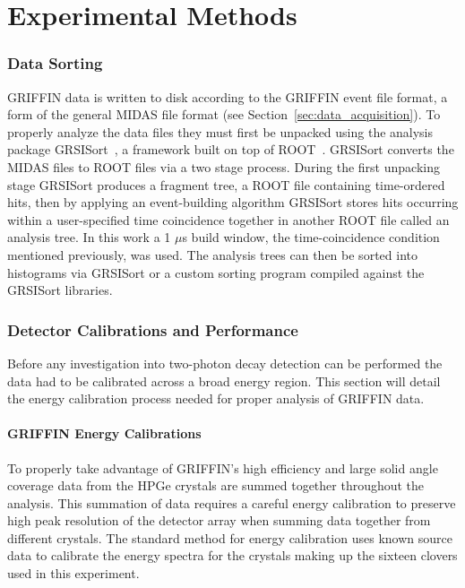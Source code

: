 \documentclass[cnatzke_thesis_proposal.tex]{subfiles}
\begin{document}
\chapter{Experimental Methods}

\subsection{Data Sorting}
GRIFFIN data is written to disk according to the GRIFFIN event file format, a form of the general MIDAS file format (see Section~\ref{sec:data_acquisition}).
To properly analyze the data files they must first be unpacked using the analysis package GRSISort~\cite{bildstein_griffincollaborationgrsisort_2019}, a framework built on top of ROOT~\cite{brun_root-projectroot_2019}.
GRSISort converts the MIDAS files to ROOT files via a two stage process.
During the first unpacking stage GRSISort produces a fragment tree, a ROOT file containing time-ordered hits, then by applying an event-building algorithm GRSISort stores hits occurring within a user-specified time coincidence together in another ROOT file called an analysis tree.
In this work a 1 $\mu$s build window, the time-coincidence condition mentioned previously, was used.
The analysis trees can then be sorted into histograms via GRSISort or a custom sorting program compiled against the GRSISort libraries.

\subsection{Detector Calibrations and Performance}
Before any investigation into two-photon decay detection can be performed the data had to be calibrated across a broad energy region. This section will detail the energy calibration process needed for proper analysis of GRIFFIN data. 

\subsubsection{GRIFFIN Energy Calibrations}
To properly take advantage of GRIFFIN's high efficiency and large solid angle coverage data from the HPGe crystals are summed together throughout the analysis.
This summation of data requires a careful energy calibration to preserve high peak resolution of the detector array when summing data together from different crystals. 
The standard method for energy calibration uses known source data to calibrate the energy spectra for the crystals making up the sixteen clovers used in this experiment. 
\end{document}
